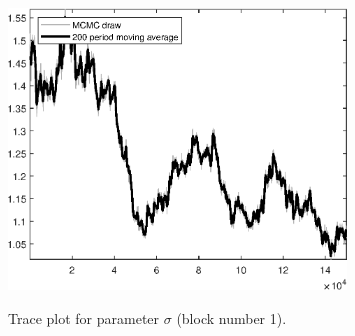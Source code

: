 \begin{figure}[H]
\centering
  \includegraphics[width=0.8\textwidth]{BRS_sectoral_KK/graphs/TracePlot_sigma_blck_1}\\
    \caption{Trace plot for parameter ${\sigma}$ (block number 1).}
\end{figure}
